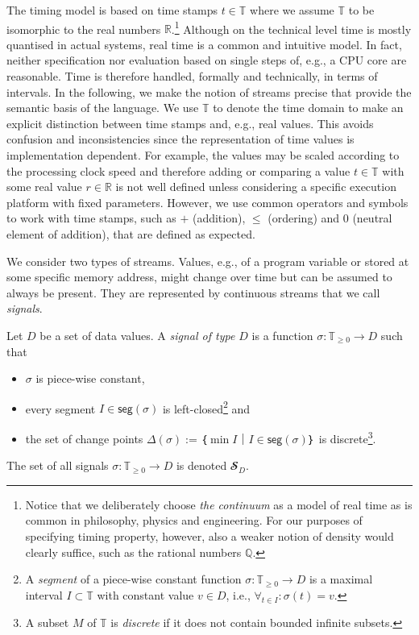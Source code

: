 The timing model is based on time stamps $t∈𝕋$ where we assume $𝕋$ to be isomorphic to the real numbers $ℝ$.\footnote{Notice that we deliberately choose \emph{the continuum} as a model of real time as is common in philosophy, physics and engineering. For our purposes of specifying timing property, however, also a weaker notion of density would clearly suffice, such as the rational numbers $ℚ$.}
Although on the technical level time is mostly quantised in actual systems, real time is a common and intuitive model.
In fact, neither specification nor evaluation based on single steps of, e.g., a CPU core are reasonable.
Time is therefore handled, formally and technically, in terms of intervals.
In the following, we make the notion of streams precise that provide the semantic basis of the language.
We use $𝕋$ to denote the time domain to make an explicit distinction between time stamps and, e.g., real values.
This avoids confusion and inconsistencies since the representation of time values is implementation dependent.
For example, the values may be scaled according to the processing clock speed and therefore adding or comparing a value $t∈𝕋$ with some real value $r∈ℝ$ is not well defined unless considering a specific execution platform with fixed parameters.
However, we use common operators and symbols to work with time stamps, such as $+$ (addition), $≤$ (ordering) and $0$ (neutral element of addition), that are defined as expected.

We consider two types of streams.
Values, e.g., of a program variable or stored at some specific memory address, might change over time but can be assumed to always be present.
They are represented by continuous streams that we call \emph{signals}. 

\begin{definition}[Signals]
  Let $D$ be a set of data values.
  A \emph{signal of type $D$} is a function $σ: 𝕋_{≥0} → D$ such that
  \begin{itemize}
    \item $σ$ is piece-wise constant,
    \item every segment $I∈\mathsf{seg}(σ)$ is left-closed\footnote{
          A \emph{segment} of a piece-wise constant function $σ: 𝕋_{≥0} → D$ is a maximal interval $I⊂𝕋$ with constant value $v∈D$, i.e., $∀_{t∈I}:σ(t)=v$.} and
    \item the set of change points $Δ(σ) := ｛\min I｜I∈\mathsf{seg}(σ)｝$ is discrete\footnote{A subset $M$ of $𝕋$ is \emph{discrete} if it does not contain bounded infinite subsets.}.
  \end{itemize}
  The set of all signals $σ: 𝕋_{≥0} → D$ is denoted $𝓢_D$.
\end{definition}

